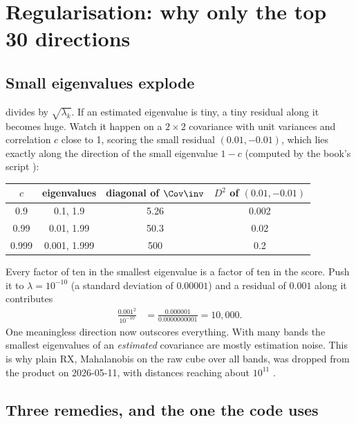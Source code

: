\section{Regularisation: why only the top 30 directions}\label{sec:residualmaha:regularise}

\subsection{Small eigenvalues explode}

 divides by $\sqrt{\lambda_k}$. If an estimated eigenvalue is tiny, a tiny
residual along it becomes huge. Watch it happen on a $2\times2$ covariance with unit variances and
correlation $c$ close to 1, scoring the small residual $(0.01,-0.01)$, which lies exactly along the
direction of the small eigenvalue $1-c$ (computed by the book's script \tagC):
\begin{center}\small
\begin{tabular}{@{}cccc@{}}
\toprule
$c$ & eigenvalues & diagonal of $\Cov\inv$ & $D^2$ of $(0.01,-0.01)$\\
\midrule
0.9 & 0.1, 1.9 & 5.26 & 0.002\\
0.99 & 0.01, 1.99 & 50.3 & 0.02\\
0.999 & 0.001, 1.999 & 500 & 0.2\\
\bottomrule
\end{tabular}
\end{center}
Every factor of ten in the smallest eigenvalue is a factor of ten in the score. Push it to $\lambda=10^{-10}$
(a standard deviation of $0.00001$) and a residual of $0.001$ along it contributes
\begin{align*}
\frac{0.001^2}{10^{-10}} &= \frac{0.000001}{0.0000000001} = 10{,}000.
\end{align*}
One meaningless direction now outscores everything. With many bands the smallest eigenvalues of an
\emph{estimated} covariance are mostly estimation noise. This is why plain RX, Mahalanobis on the raw cube over
all bands, was dropped from the product on 2026-05-11, with distances reaching about
$10^{11}$ .

\subsection{Three remedies, and the one the code uses}

